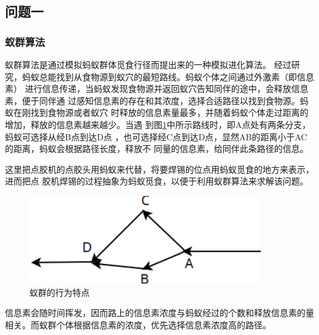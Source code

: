 \documentclass[fontset=windows,a4paper,12pt]{ctexart}
\begin{document}
    \subsection{问题一}
	   \subsubsection{蚁群算法}
		   蚁群算法是通过模拟蚂蚁群体觅食行径而提出来的一种模拟进化算法\cite{士勇2004蚁群算法及其应用}。
		   经过研究，蚂蚁总能找到从食物源到蚁穴的最短路线。蚂蚁个体之间通过外激素（即信息素）
		   进行信息传递，当蚂蚁发现食物源并返回蚁穴告知同伴的途中，会释放信息素，便于同伴通
		   过感知信息素的存在和其浓度，选择合适路径以找到食物源。蚂蚁在刚找到食物源或者蚁穴
		   时释放的信息素量最多，并随着蚂蚁个体走过距离的增加，释放的信息素越来越少。当遇
		   到图\ref{fig:anti1}中所示路线时，即A点处有两条分支，蚂蚁可选择从经B点到达D点
		   ，也可选择经C点到达D点，显然AB的距离小于AC的距离，蚂蚁会根据路径长度，释放不
		   同量的信息素，给同伴此条路径的信息\cite{马良2001蚂蚁算法在组合优化中的应用}。
		   
		   这里把点胶机的点胶头用蚂蚁来代替，将要焊锡的位点用蚂蚁觅食的地方来表示，进而把点
		   胶机焊锡的过程抽象为蚂蚁觅食，以便于利用蚁群算法来求解该问题。
    	   \begin{figure}[htbp]
    	   	\centering
    	   	\includegraphics[width=10cm]{pic/anti1.png}
    	   	\caption{蚁群的行为特点}
    	   	\label{fig:anti1}
    	   \end{figure}		   

			信息素会随时间挥发，因而路上的信息素浓度与蚂蚁经过的个数和释放信息素的量
			相关。而蚁群个体根据信息素的浓度，优先选择信息素浓度高的路径。
			
\end{document}
